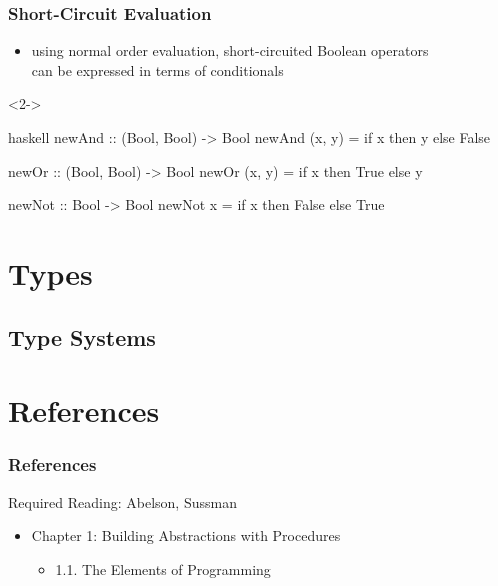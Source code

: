 \documentclass[dvipsnames]{beamer}
\theoremstyle{plain}
\begin{document}
\begin{frame}[fragile]
  \frametitle{Short-Circuit Evaluation}

  \begin{itemize}
    \item using normal order evaluation, short-circuited Boolean operators\\
      can be expressed in terms of conditionals
  \end{itemize}

  \begin{visibleenv}<2->
  \begin{example}[Haskell]
    \begin{pygments}{haskell}
newAnd :: (Bool, Bool) -> Bool
newAnd (x, y) = if x then y else False

newOr :: (Bool, Bool) -> Bool
newOr (x, y) = if x then True else y

newNot :: Bool -> Bool
newNot x = if x then False else True
    \end{pygments}
  \end{example}
  \end{visibleenv}
\end{frame}

\section{Types}

\subsection{Type Systems}

\section*{References}

\begin{frame}
  \frametitle{References}

  \begin{block}{Required Reading: Abelson, Sussman}
    \begin{itemize}
      \item Chapter 1: Building Abstractions with Procedures
      \begin{itemize}
        \item 1.1. \alert{The Elements of Programming}
      \end{itemize}
    \end{itemize}
  \end{block}
\end{frame}
\end{document}
